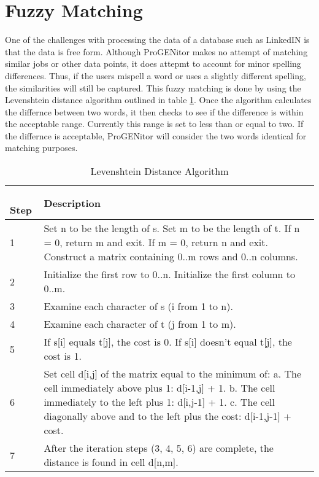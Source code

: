 \section{Fuzzy Matching}
\label{sect:fuzzy-matching}
One of the challenges with processing the data of a database such as LinkedIN is
that the data is free form.  Although ProGENitor makes no attempt of matching
similar jobs or other data points, it does attepmt to account for minor spelling
differences.  Thus, if the users mispell a word or uses a slightly different
spelling, the similarities will still be captured. This fuzzy matching is
done by using the Levenshtein distance algorithm outlined in table
\ref{tab:lev-dist}.  Once the algorithm calculates the differnce between two
words, it then checks to see if the difference is within the acceptable range. 
Currently this range is set to less than or equal to two.  If the differnce is
acceptable, ProGENitor will consider the two words identical for matching
purposes.


\begin{table}[H]
  \caption{Levenshtein Distance Algorithm\cite{fuzzy}}
  \centering
  \begin{tabular}{|p{.5in}|p{4in}|}
  \hline
  \
  Step & Description \\
  \hline\hline
  1 &  Set n to be the length of s.\newline 
  Set m to be the length of t.\newline
  If n = 0, return m and exit.\newline
  If m = 0, return n and exit.\newline
  Construct a matrix containing 0..m rows and 0..n columns.  \\ \hline 
  2 &  	Initialize the first row to 0..n.\newline
  Initialize the first column to 0..m.\\ \hline 
  3 & Examine each character of s (i from 1 to n). \\ \hline
  4 & Examine each character of t (j from 1 to m). \\ \hline
  5 &  	If s[i] equals t[j], the cost is 0.\newline
  If s[i] doesn't equal t[j], the cost is 1. \\\hline 
  6 &  	Set cell d[i,j] of the matrix equal to the minimum of:\newline
  a. The cell immediately above plus 1: d[i-1,j] + 1.\newline
  b. The cell immediately to the left plus 1: d[i,j-1] + 1.\newline
  c. The cell diagonally above and to the left plus the cost: d[i-1,j-1] + cost.\\ \hline
  7 & After the iteration steps (3, 4, 5, 6) are complete, the distance is found in cell d[n,m]. \\ \hline
  \end{tabular}
  \label{tab:lev-dist}
\end{table}

